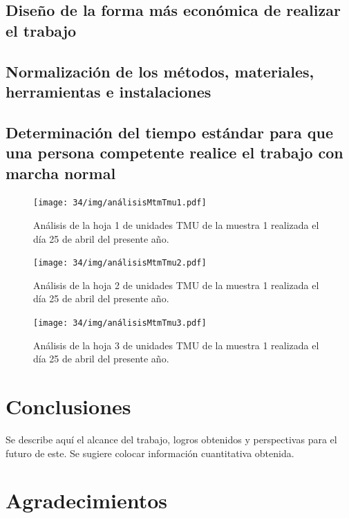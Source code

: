     \subsection{Diseño de la forma más económica de realizar el trabajo}
    
    \subsection{Normalización de los métodos, materiales, herramientas e instalaciones}
    \subsection{Determinación del tiempo estándar para que una persona competente realice el trabajo con marcha normal}
    
    \begin{figure}[H]
        \centering
        \texttt{[image: 34/img/análisisMtmTmu1.pdf]}
        \caption{Análisis de la hoja 1 de unidades TMU de la muestra 1 realizada el día 25 de abril del presente año.}
        \label{fig:análisisMtmTmu1}
    \end{figure}
    
    \begin{figure}[H]
        \centering
        \texttt{[image: 34/img/análisisMtmTmu2.pdf]}
        \caption{Análisis de la hoja 2 de unidades TMU de la muestra 1 realizada el día 25 de abril del presente año.}
        \label{fig:análisisMtmTmu2}
    \end{figure}
    
    \begin{figure}[H]
        \centering
        \texttt{[image: 34/img/análisisMtmTmu3.pdf]}
        \caption{Análisis de la hoja 3 de unidades TMU de la muestra 1 realizada el día 25 de abril del presente año.}
        \label{fig:análisisMtmTmu3}
    \end{figure}
    \section{Conclusiones}
    
    Se describe aquí el alcance del trabajo, logros obtenidos y perspectivas para el futuro de este. Se sugiere colocar información cuantitativa obtenida.
    
    \section{Agradecimientos}
    
